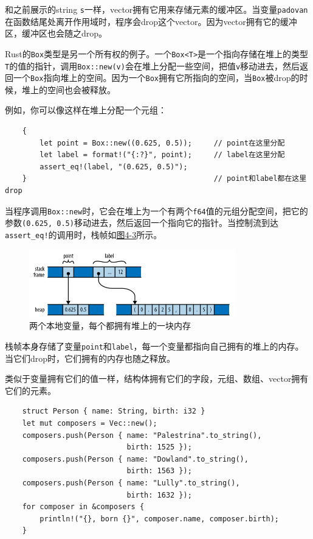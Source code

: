 和之前展示的string \texttt{s}一样，vector拥有它用来存储元素的缓冲区。当变量\texttt{padovan}在函数结尾处离开作用域时，程序会drop这个vector。因为vector拥有它的缓冲区，缓冲区也会随之drop。

Rust的\texttt{Box}类型是另一个所有权的例子。一个\texttt{Box<T>}是一个指向存储在堆上的类型\texttt{T}的值的指针，调用\texttt{Box::new(v)}会在堆上分配一些空间，把值\texttt{v}移动进去，然后返回一个\texttt{Box}指向堆上的空间。因为一个\texttt{Box}拥有它所指向的空间，当\texttt{Box}被drop的时候，堆上的空间也会被释放。

例如，你可以像这样在堆上分配一个元组：
\begin{verbatim}
    {
        let point = Box::new((0.625, 0.5));     // point在这里分配
        let label = format!("{:?}", point);     // label在这里分配
        assert_eq!(label, "(0.625, 0.5)");
    }                                           // point和label都在这里drop
\end{verbatim}

当程序调用\texttt{Box::new}时，它会在堆上为一个有两个\texttt{f64}值的元组分配空间，把它的参数\texttt{(0.625, 0.5)}移动进去，然后返回一个指向它的指针。当控制流到达\texttt{assert\_eq!}的调用时，栈帧如\hyperref[f4-3]{图4-3}所示。

\begin{figure}[htbp]
    \centering
    \includegraphics[width=0.8\textwidth]{../img/f4-3.png}
    \caption{两个本地变量，每个都拥有堆上的一块内存}
    \label{f4-3}
\end{figure}

栈帧本身存储了变量\texttt{point}和\texttt{label}，每一个变量都指向自己拥有的堆上的内存。当它们drop时，它们拥有的内存也随之释放。

类似于变量拥有它们的值一样，结构体拥有它们的字段，元组、数组、vector拥有它们的元素。

\begin{verbatim}
    struct Person { name: String, birth: i32 }
    let mut composers = Vec::new();
    composers.push(Person { name: "Palestrina".to_string(),
                            birth: 1525 });
    composers.push(Person { name: "Dowland".to_string(),
                            birth: 1563 });
    composers.push(Person { name: "Lully".to_string(),
                            birth: 1632 });
    for composer in &composers {
        println!("{}, born {}", composer.name, composer.birth);
    }
\end{verbatim}

